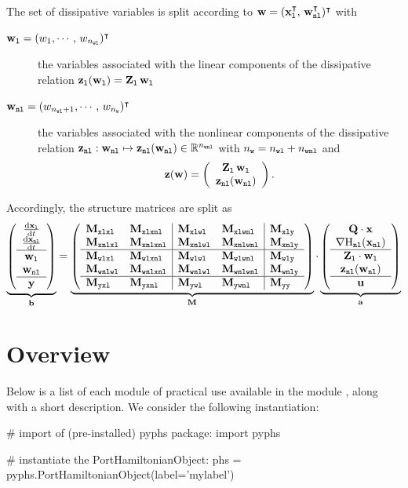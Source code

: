 \documentclass[10pt,a4paper]{article}
\begin{document}
%
The set of dissipative variables is split according to $\vw = (\vxl^\T, \, \vwnl^\T)^\T$ with 
%
\begin{description}
%
\item[$\vwl = (w_1,\cdots,\,w_\nwl)^\T$] the variables associated with the linear components of the dissipative relation $\vzl(\vwl)=\mat{Z}_{\lab l}\,\vwl$
%
\item[$\vwnl=(w_{\nwl+1},\cdots,\,w_\nw)^\T$] the variables associated with the nonlinear components of the dissipative relation $\vznl:\vwnl\mapsto\vznl(\vwnl)\in\RR^{\nwnl}$ with $\nw = \nwl+\nwnl$ and $$ \vz(\vw) = \left(\begin{array}{c}
\mat{Z}_{\lab l}\,\vwl\\
\vznl(\vwnl)
\end{array} \right).$$
%
\end{description}
%

Accordingly, the structure matrices are split as
%
\begin{equation}
\underbrace{\left(\begin{array}{c}
\D{\vxl}{t}\\
\D{\vxnl}{t}\\ \hline
\vwl\\
\vwnl\\ \hline
\vy
\end{array}\right)}_{\vec b}
 = \underbrace{\left(\begin{array}{ll|ll|l}
\M{xlxl}&\M{xlxnl}&\M{xlwl} & \M{xlwnl} & \M{xly}\\ 
\M{xnlxl}&\M{xnlxnl}&\M{xnlwl} &  \M{xnlwnl} & \M{xnly}\\ \hline
\M{wlxl}& \M{wlxnl}& \M{wlwl} & \M{wlwnl} & \M{wly}\\
\M{wnlwl}& \M{wnlxnl}& \M{wnlwl} & \M{wnlwnl} & \M{wnly}\\ \hline
\M{yxl} &\M{yxnl}&\M{ywl} & \M{ywnl} &\M{yy}
\end{array}\right)}_{\M{}}
\cdot
\underbrace{\left(\begin{array}{c}
\Q\cdot\vx\\
\nabla\Hnl(\vxnl)\\ \hline
\mat{Z}_{\lab l}\cdot\vwl\\
\vznl(\vwnl)\\ \hline
\vu
\end{array}\right) }_{\vec a}
\end{equation}
%
\tableofcontents
%
\section{Overview}
%
Below is a list of each module of practical use available in the module , along with a short description. We consider the following instantiation:
%
\begin{python}
# import of (pre-installed) pyphs package:
import pyphs

# instantiate the PortHamiltonianObject:
phs = pyphs.PortHamiltonianObject(label='mylabel')
\end{python}
%
\end{document}
